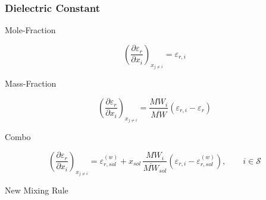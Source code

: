 \documentclass[12pt, letterpaper]{article}
\begin{document}
\subsubsection{Dielectric Constant}

Mole-Fraction

\begin{equation}
    \left(\frac{\partial \varepsilon_{r}}{\partial x_{i}}\right)_{x_{j\neq i}}
    = \varepsilon_{r, i}
    \label{eq:depsr_dxi_mole}
\end{equation}

Mass-Fraction

\begin{equation}
    \left(\frac{\partial \varepsilon_{r}}{\partial x_{i}}\right)_{x_{j\neq i}}
    =
    \frac{MW_{i}}{\overline{MW}}\left(\varepsilon_{r,i}-\varepsilon_{r}\right)
    \label{eq:depsr_dxi_mass}
\end{equation}

Combo

\begin{equation}
    \left(\frac{\partial \varepsilon_{r}}{\partial x_{i}}\right)_{x_{j\neq i}}
    =
    \varepsilon_{r,sol}^{(w)}
    +
    x_{sol}\,\frac{MW_{i}}{\overline{MW}_{sol}}
    \left(\varepsilon_{r,i}-\varepsilon_{r,sol}^{(w)}\right),
    \qquad i\in\mathcal S
    \label{eq:depsr_dxi_combo}
\end{equation}

New Mixing Rule
\end{document}
